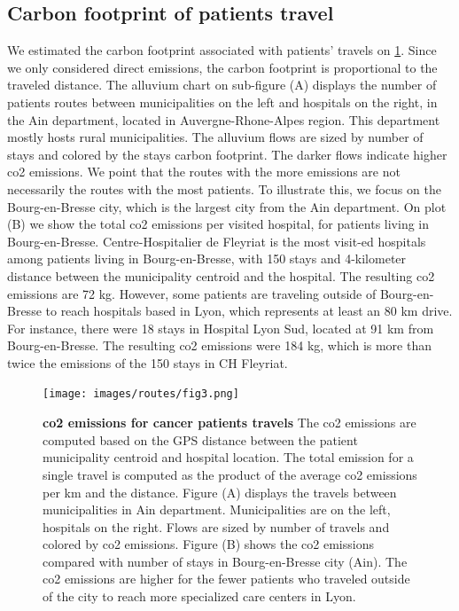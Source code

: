 \subsection{Carbon footprint of patients travel}

We estimated the carbon footprint associated with patients' travels on
\cref{fig:routes-co2-emissions}. Since we only considered direct emissions, the
carbon footprint is proportional to the traveled distance. The alluvium chart on
sub-figure (A) displays the number of patients routes between municipalities on
the left and hospitals on the right, in the Ain department, located in
Auvergne-Rhone-Alpes region. This department mostly hosts rural municipalities.
The alluvium flows are sized by number of stays and colored by the stays carbon
footprint. The darker flows indicate higher \ac{co2} emissions. We point that
the routes with the more emissions are not necessarily the routes with the most
patients. To illustrate this, we focus on the Bourg-en-Bresse city, which is the
largest city from the Ain department. On plot (B) we show the total \ac{co2}
emissions per visited hospital, for patients living in Bourg-en-Bresse.
Centre-Hospitalier de Fleyriat is the most visit-ed hospitals among patients
living in Bourg-en-Bresse, with 150 stays and 4-kilometer distance between the
municipality centroid and the hospital. The resulting \ac{co2} emissions are 72
kg. However, some patients are traveling outside of Bourg-en-Bresse to reach
hospitals based in Lyon, which represents at least an 80 km drive. For instance,
there were 18 stays in Hospital Lyon Sud, located at 91 km from Bourg-en-Bresse.
The resulting \ac{co2} emissions were 184 kg, which is more than twice the
emissions of the 150 stays in CH Fleyriat.

\begin{figure}[h!]
    \texttt{[image: images/routes/fig3.png]}
    \centering
    \caption{ \textbf{\ac{co2} emissions for cancer patients travels} The
        \ac{co2} emissions are computed based on the GPS distance between the
        patient municipality centroid and hospital location. The total emission
        for a single travel is computed as the product of the average \ac{co2}
        emissions per km and the distance. Figure (A) displays the travels
        between municipalities in Ain department. Municipalities are on the
        left, hospitals on the right. Flows are sized by number of travels and
        colored by \ac{co2} emissions. Figure (B) shows the \ac{co2} emissions
        compared with number of stays in Bourg-en-Bresse city (Ain). The
        \ac{co2} emissions are higher for the fewer patients who traveled
        outside of the city to reach more specialized care centers in Lyon. }
    \label{fig:routes-co2-emissions}
\end{figure}

